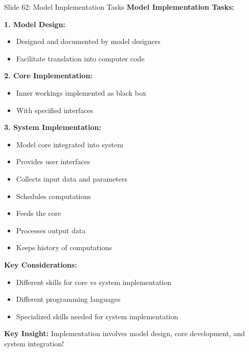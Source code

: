 \documentclass[8pt]{beamer}
\begin{document}
	\begin{frame}{Slide 62: Model Implementation Tasks}
		\fontsize{6.5}{7.5}\selectfont
		\textbf{Model Implementation Tasks:}
		
		\vspace{0.1cm}
		\textbf{1. Model Design:}
		\begin{itemize}
			\item Designed and documented by model designers
			\item Facilitate translation into computer code
		\end{itemize}
		
		\vspace{0.1cm}
		\textbf{2. Core Implementation:}
		\begin{itemize}
			\item Inner workings implemented as black box
			\item With specified interfaces
		\end{itemize}
		
		\vspace{0.1cm}
		\textbf{3. System Implementation:}
		\begin{itemize}
			\item Model core integrated into system
			\item Provides user interfaces
			\item Collects input data and parameters
			\item Schedules computations
			\item Feeds the core
			\item Processes output data
			\item Keeps history of computations
		\end{itemize}
		
		\vspace{0.1cm}
		\textbf{Key Considerations:}
		\begin{itemize}
			\item Different skills for core vs system implementation
			\item Different programming languages
			\item Specialized skills needed for system implementation
		\end{itemize}
		
		\textcolor{myblue}{\textbf{Key Insight:}} Implementation involves \textcolor{myblue}{model design, core development, and system integration}!
	\end{frame}
	
\end{document}
